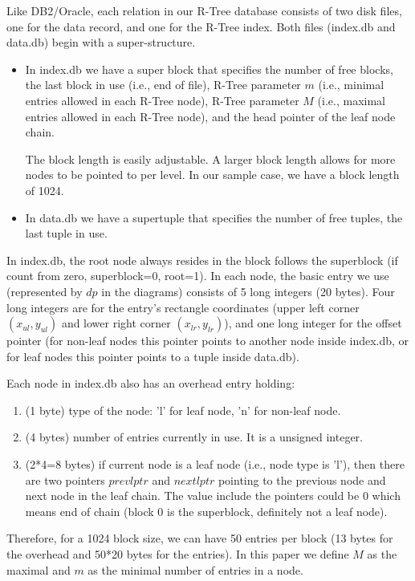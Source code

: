 \documentclass[12pt]{article}
\begin{document}
Like DB2/Oracle, each relation in our R-Tree database consists of
two disk files, one for the data record, and one for the R-Tree
index.   Both files (index.db and data.db) begin with a
super-structure.
\begin{itemize}
\item In index.db we have a super block that specifies the number
      of free blocks, the last block in use (i.e., end of file),
      R-Tree parameter $m$ (i.e., minimal entries allowed in each
      R-Tree node), R-Tree parameter $M$ (i.e., maximal entries
      allowed in each R-Tree node), and the head pointer of the
      leaf node chain.

      The block length is easily adjustable. A larger block length
      allows for more nodes to be pointed to per level. In our
      sample case, we have a block length of 1024.
\item In data.db we have a supertuple that specifies the number of
      free tuples, the last tuple in use.
\end{itemize}

In index.db, the root node always resides in the block follows the
superblock (if count from zero, superblock=0, root=1).  In each
node, the basic entry we use (represented by $dp$ in the diagrams)
consists of 5 long integers (20 bytes).  Four long integers are
for the entry's rectangle coordinates (upper left corner
$(x_{ul},y_{ul})$ and lower right corner $(x_{lr},y_{lr})$), and
one long integer for the offset pointer (for non-leaf nodes this
pointer points to another node inside index.db, or for leaf nodes
this pointer points to a tuple inside data.db).

Each node in index.db also has an overhead entry holding:
\begin{enumerate}
\item (1 byte) type of the node: 'l' for leaf node, 'n' for
      non-leaf node.
\item (4 bytes) number of entries currently in use. It is a
      unsigned integer.
\item (2*4=8 bytes) if current node is a leaf node (i.e., node
      type is 'l'), then there are two pointers $prevlptr$ and
      $nextlptr$ pointing to the previous node and next node in
      the leaf chain.  The value include the pointers could be 0
      which means end of chain (block 0 is the superblock,
      definitely not a leaf node).
\end{enumerate}
Therefore, for a 1024 block size, we can have 50 entries per block
(13 bytes for the overhead and 50*20 bytes for the
entries).  In this paper we define $M$ as the maximal and $m$ as
the minimal number of entries in a node.
\end{document}
